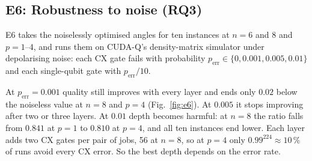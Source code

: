 
\subsection{E6: Robustness to noise (RQ3)}
\label{sec:e6}

E6 takes the noiselessly optimised angles for ten instances at $n = 6$ and $8$ and $p = 1$--$4$, and runs them on CUDA-Q's density-matrix simulator under depolarising noise: each CX gate fails with probability $p_{\text{err}} \in \{0, 0.001, 0.005, 0.01\}$ and each single-qubit gate with $p_{\text{err}}/10$.

At $p_{\text{err}} = 0.001$ quality still improves with every layer and ends only $0.02$ below the noiseless value at $n = 8$ and $p = 4$ (Fig.~\ref{fig:e6}).
At $0.005$ it stops improving after two or three layers.
At $0.01$ depth becomes harmful: at $n = 8$ the ratio falls from $0.841$ at $p = 1$ to $0.810$ at $p = 4$, and all ten instances end lower.
Each layer adds two CX gates per pair of jobs, 56 at $n = 8$, so at $p = 4$ only $0.99^{224} \approx 10\,\%$ of runs avoid every CX error.
So the best depth depends on the error rate.
